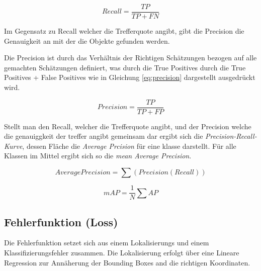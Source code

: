 \begin{equation}
  \label{eq:recall}
  Recall = \frac{TP}{TP + FN}
\end{equation}

\vspace{0.5cm}

Im Gegensatz zu Recall welcher die Trefferquote angibt, 
gibt die Precision die Genauigkeit an mit der die Objekte
gefunden werden.

Die Precision ist durch das Verhältnis der Richtigen 
Schätzungen bezogen auf alle gemachten Schätzungen definiert, 
was durch die True Positives durch die True Positives + 
False Positives wie in Gleichung \ref{eq:precision}
dargestellt ausgedrückt wird.


\begin{equation}
  \label{eq:precision}
  Precision = \frac{TP}{TP + FP}
\end{equation}

\vspace{0.5cm}

Stellt man den Recall, welcher die Trefferquote angibt, und der 
Precision welche die genauiggkeit der treffer angibt gemeinsam 
dar ergibt sich die \textit{Precision-Recall-Kurve}, dessen 
Fläche die \textit{Average Prcision} für eine klasse darstellt.
Für alle Klassen im Mittel ergibt sich so die \textit{mean Average 
Precision}.

\vspace{0.5cm}

\begin{equation}
  Average Precision = \sum(Precision(Recall))
\end{equation}

\begin{equation}
  mAP = \frac{1}{N} \sum AP
\end{equation}

\vspace{0.5cm}





\subsection*{Fehlerfunktion (Loss)}
Die Fehlerfunktion setzet sich aus einem Lokalisierungs und einem 
Klassifizierungsfehler zusammen. 
Die Lokalisierung erfolgt über eine Lineare Regression zur 
Annäherung der Bounding Boxes and die richtigen Koordinaten.\\



